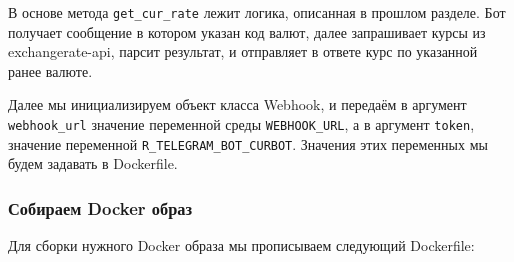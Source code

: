 \documentclass[
]{book}
\newenvironment{Shaded}{\begin{snugshade}}{\end{snugshade}}
\newcommand{\AttributeTok}[1]{\textcolor[rgb]{0.13,0.29,0.53}{#1}}
\newcommand{\CommentTok}[1]{\textcolor[rgb]{0.56,0.35,0.01}{\textit{#1}}}
\newcommand{\DecValTok}[1]{\textcolor[rgb]{0.00,0.00,0.81}{#1}}
\newcommand{\FunctionTok}[1]{\textcolor[rgb]{0.13,0.29,0.53}{\textbf{#1}}}
\newcommand{\NormalTok}[1]{#1}
\newcommand{\OtherTok}[1]{\textcolor[rgb]{0.56,0.35,0.01}{#1}}
\newcommand{\SpecialCharTok}[1]{\textcolor[rgb]{0.81,0.36,0.00}{\textbf{#1}}}
\newcommand{\StringTok}[1]{\textcolor[rgb]{0.31,0.60,0.02}{#1}}
\begin{document}
\begin{Shaded}
\end{Shaded}

В основе метода \texttt{get\_cur\_rate} лежит логика, описанная в прошлом разделе. Бот получает сообщение в котором указан код валют, далее запрашивает курсы из exchangerate-api, парсит результат, и отправляет в ответе курс по указанной ранее валюте.

Далее мы инициализируем объект класса Webhook, и передаём в аргумент \texttt{webhook\_url} значение переменной среды \texttt{WEBHOOK\_URL}, а в аргумент \texttt{token}, значение переменной \texttt{R\_TELEGRAM\_BOT\_CURBOT}. Значения этих переменных мы будем задавать в Dockerfile.

\subsubsection{Собираем Docker образ}\label{ux441ux43eux431ux438ux440ux430ux435ux43c-docker-ux43eux431ux440ux430ux437}

Для сборки нужного Docker образа мы прописываем следующий Dockerfile:
\end{document}
